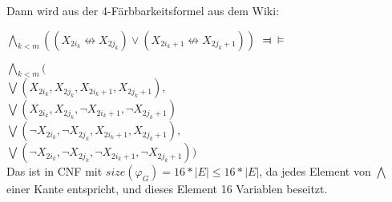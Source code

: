 Dann wird aus der 4-Färbbarkeitsformel aus dem Wiki:
 
 $\bigwedge_{k<m}( (X_{2i_k} \not \leftrightarrow X_{2j_k}  ) \vee (X_{2i_k +1} \not \leftrightarrow X_{2j_k +1} ) ) $
 $\Dashv \vDash$
 
$\bigwedge_{k<m} ($ \\
$ \bigvee ( X_{2i_k}, X_{2j_k},  X_{2i_k +1}, X_{2j_k +1}),$\\
$ \bigvee ( X_{2i_k}, X_{2j_k}, \neg X_{2i_k +1} ,  \neg X_{2j_k +1} )$\\
$  \bigvee ( \neg X_{2i_k} ,  \neg X_{2j_k},  X_{2i_k +1}, X_{2j_k +1}),$\\
$ \bigvee ( \neg X_{2i_k} ,  \neg X_{2j_k}, \neg X_{2i_k +1} ,  \neg X_{2j_k +1} ))$ \\
Das ist in CNF mit $size(\varphi_G) =16 * |E| \leq 16* |E|$, da jedes Element von $\bigwedge$ einer Kante entspricht, und dieses  Element 16 Variablen beseitzt.
  
